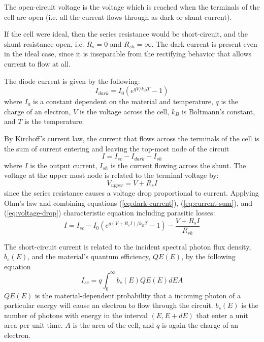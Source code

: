 \documentclass{homework}
\begin{document}
\begin{letterenum}
The open-circuit voltage is the voltage which is reached when the terminals of
the cell are open (i.e. all the current flows through as dark or shunt current).

If the cell were ideal, then the series resistance would be short-circuit, and
the shunt resistance open, i.e. $R_s = 0$ and $R_{sh} = \infty$. The dark current
is present even in the ideal case, since it is inseparable from the rectifying
behavior that allows current to flow at all.

\item The diode current is given by the following:
\begin{equation*}
    I_{dark} = I_0 (e^{qV / k_B T} - 1)
    \label{eq:dark-current}
\end{equation*}
where $I_0$ is a constant dependent on the material and temperature, $q$ is the
charge of an electron, $V$ is the voltage across the cell, $k_B$ is Boltmann's
constant, and $T$ is the temperature.

\item By Kirchoff's current law, the current that flows across the terminals of
the cell is the sum of current entering and leaving the top-most node of the circuit
\begin{equation}
    I = I_{sc} - I_{dark} - I_{sh}
    \label{eq:current-sum}
\end{equation}
where $I$ is the output current, $I_{sh}$ is the current flowing across the shunt.
The voltage at the upper most node is related to the terminal voltage by:
\begin{equation}
    V_{upper} = V + R_s I
    \label{eq:voltage-drop}
\end{equation}
since the series resistance causes a voltage drop proportional to current.
Applying Ohm's law and combining equations (\ref{eq:dark-current}),
(\ref{eq:current-sum}), and (\ref{eq:voltage-drop}) characteristic
equation including parasitic losses:
\begin{equation*}
    I = I_{sc} - I_0 (e^{q (V + R_s I)/ k_B T} - 1) - \frac{V + R_sI}{R_{sh}}
    \label{eq:solar-characteristic}
\end{equation*}

\item The short-circuit current is related to the incident spectral
photon flux density, $b_s(E)$, and the material's quantum efficiency, $QE(E)$,
by the following equation
\begin{equation*}
    I_{sc} = q \int_{0}^{\infty} b_s(E) QE(E) dE A
\end{equation*}
$QE(E)$ is the material-dependent probability that a incoming photon
of a particular energy will cause an electron to flow through the circuit.
$b_s(E)$ is the number of photons with energy in the interval $(E, E + dE)$
that enter a unit area per unit time. $A$ is the area of the cell, and
$q$ is again the charge of an electron.


\end{letterenum}
\end{document}
